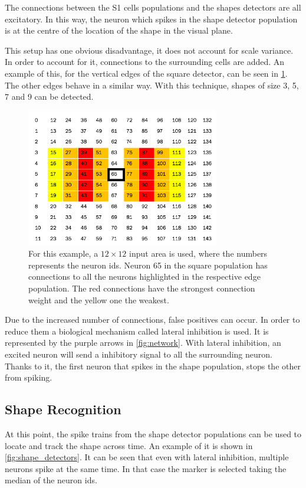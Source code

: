 The connections between the \textsc{S1} cells populations and the shapes detectors are all excitatory. In this way, the neuron which spikes in the shape detector population is at the centre of the location of the shape in the visual plane. 

This setup has one obvious disadvantage, it does not account for scale variance. In order to account for it, connections to the surrounding cells are added. An example of this, for the vertical edges of the square detector, can be seen in \cref{fig:shapes_connections}. The other edges behave in a similar way. With this technique, shapes of size 3, 5, 7 and 9 can be detected. 

\begin{figure}[ht]
\centering
\includegraphics[width=0.75\textwidth]{images/development/shapes_connections.png}
\caption[Vertical Edges of the Square Detector]{For this example, a $12 \times 12$ input area is used, where the numbers represents the neuron ids. Neuron 65 in the square population has connections to all the neurons highlighted in the respective edge population. The red connections have the strongest connection weight and the yellow one the weakest.}
\label{fig:shapes_connections}
\end{figure}

Due to the increased number of connections, false positives can occur. In order to reduce them a biological mechanism called lateral inhibition is used. It is represented by the purple arrows in \cref{fig:network}. With lateral inhibition, an excited neuron will send a inhibitory signal to all the surrounding neuron. Thanks to it, the first neuron that spikes in the shape population, stops the other from spiking.

\subsection{Shape Recognition}
At this point, the spike trains from the shape detector populations can be used to locate and track the shape across time. An example of it is shown in \cref{fig:shape_detectors}. It can be seen that even with lateral inhibition, multiple neurons spike at the same time. In that case the marker is selected taking the median of the neuron ids. 

